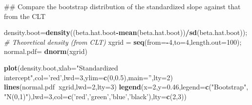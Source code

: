 \documentclass[12pt,]{book}
\newenvironment{Shaded}{\begin{snugshade}}{\end{snugshade}}
\newcommand{\KeywordTok}[1]{\textcolor[rgb]{0.13,0.29,0.53}{\textbf{#1}}}
\newcommand{\DataTypeTok}[1]{\textcolor[rgb]{0.13,0.29,0.53}{#1}}
\newcommand{\DecValTok}[1]{\textcolor[rgb]{0.00,0.00,0.81}{#1}}
\newcommand{\FloatTok}[1]{\textcolor[rgb]{0.00,0.00,0.81}{#1}}
\newcommand{\StringTok}[1]{\textcolor[rgb]{0.31,0.60,0.02}{#1}}
\newcommand{\CommentTok}[1]{\textcolor[rgb]{0.56,0.35,0.01}{\textit{#1}}}
\newcommand{\OperatorTok}[1]{\textcolor[rgb]{0.81,0.36,0.00}{\textbf{#1}}}
\newcommand{\NormalTok}[1]{#1}
\begin{document}
\begin{Shaded}
\begin{Highlighting}[]
\NormalTok{## Compare the bootstrap distribution of the standardized slope against that from the CLT }


\NormalTok{density.boot=}\KeywordTok{density}\NormalTok{((beta.hat.boot}\OperatorTok{-}\KeywordTok{mean}\NormalTok{(beta.hat.boot))}\OperatorTok{/}\KeywordTok{sd}\NormalTok{(beta.hat.boot));}
\CommentTok{# Theoretical density (from CLT)}
\NormalTok{xgrid =}\StringTok{ }\KeywordTok{seq}\NormalTok{(}\DataTypeTok{from=}\OperatorTok{-}\DecValTok{4}\NormalTok{,}\DataTypeTok{to=}\DecValTok{4}\NormalTok{,}\DataTypeTok{length.out=}\DecValTok{100}\NormalTok{);}
\NormalTok{normal.pdf=}\StringTok{ }\KeywordTok{dnorm}\NormalTok{(xgrid)}

\KeywordTok{plot}\NormalTok{(density.boot,}\DataTypeTok{xlab=}\StringTok{"Standardized intercept"}\NormalTok{,}\DataTypeTok{col=}\StringTok{'red'}\NormalTok{,}\DataTypeTok{lwd=}\DecValTok{3}\NormalTok{,}\DataTypeTok{ylim=}\KeywordTok{c}\NormalTok{(}\DecValTok{0}\NormalTok{,}\FloatTok{0.5}\NormalTok{),}\DataTypeTok{main=}\StringTok{''}\NormalTok{,}\DataTypeTok{lty=}\DecValTok{2}\NormalTok{)}
\KeywordTok{lines}\NormalTok{(normal.pdf}\OperatorTok{~}\NormalTok{xgrid,}\DataTypeTok{lwd=}\DecValTok{2}\NormalTok{,}\DataTypeTok{lty=}\DecValTok{3}\NormalTok{)}
\KeywordTok{legend}\NormalTok{(}\DataTypeTok{x=}\DecValTok{2}\NormalTok{,}\DataTypeTok{y=}\FloatTok{0.46}\NormalTok{,}\DataTypeTok{legend=}\KeywordTok{c}\NormalTok{(}\StringTok{"Bootstrap"}\NormalTok{, }\StringTok{"N(0,1)"}\NormalTok{),}\DataTypeTok{lwd=}\DecValTok{3}\NormalTok{,}\DataTypeTok{col=}\KeywordTok{c}\NormalTok{(}\StringTok{'red'}\NormalTok{,}\StringTok{'green'}\NormalTok{,}\StringTok{'blue'}\NormalTok{,}\StringTok{'black'}\NormalTok{),}\DataTypeTok{lty=}\KeywordTok{c}\NormalTok{(}\DecValTok{2}\NormalTok{,}\DecValTok{3}\NormalTok{))}
\end{Highlighting}
\end{Shaded}
\end{document}
